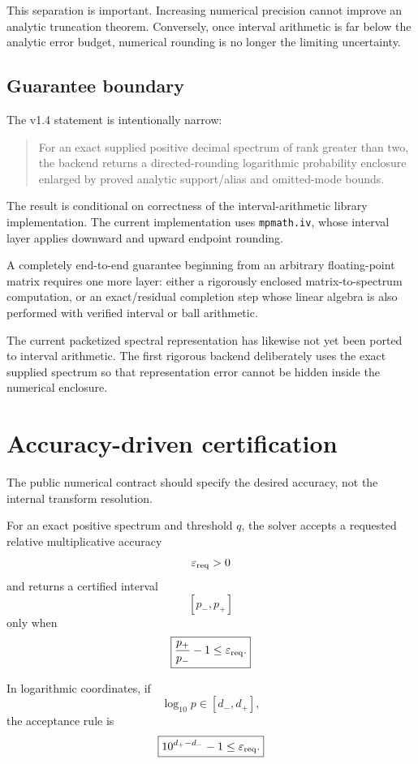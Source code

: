 \documentclass[11pt]{article}
\theoremstyle{definition}
\theoremstyle{remark}
\begin{document}
This separation is important.  Increasing numerical precision cannot improve
an analytic truncation theorem.  Conversely, once interval arithmetic is far
below the analytic error budget, numerical rounding is no longer the limiting
uncertainty.

\subsection{Guarantee boundary}

The v1.4 statement is intentionally narrow:

\begin{quote}
For an exact supplied positive decimal spectrum of rank greater than two, the
backend returns a directed-rounding logarithmic probability enclosure enlarged
by proved analytic support/alias and omitted-mode bounds.
\end{quote}

The result is conditional on correctness of the interval-arithmetic library
implementation.  The current implementation uses \texttt{mpmath.iv}, whose
interval layer applies downward and upward endpoint rounding.

A completely end-to-end guarantee beginning from an arbitrary floating-point
matrix requires one more layer: either a rigorously enclosed matrix-to-spectrum
computation, or an exact/residual completion step whose linear algebra is also
performed with verified interval or ball arithmetic.

The current packetized spectral representation has likewise not yet been
ported to interval arithmetic.  The first rigorous backend deliberately uses
the exact supplied spectrum so that representation error cannot be hidden
inside the numerical enclosure.


\section{Accuracy-driven certification}\label{sec:final-5}

The public numerical contract should specify the desired accuracy, not the
internal transform resolution.

For an exact positive spectrum and threshold \(q\), the solver accepts a
requested relative multiplicative accuracy
\[
\varepsilon_{\rm req}>0
\]
and returns a certified interval
\[
[p_-,p_+]
\]
only when
\[
\boxed{
\frac{p_+}{p_-}-1
\le
\varepsilon_{\rm req}.
}
\]

In logarithmic coordinates, if
\[
\log_{10}p\in[d_-,d_+],
\]
the acceptance rule is
\[
\boxed{
10^{d_+-d_-}-1
\le
\varepsilon_{\rm req}.
}
\]
\end{document}
